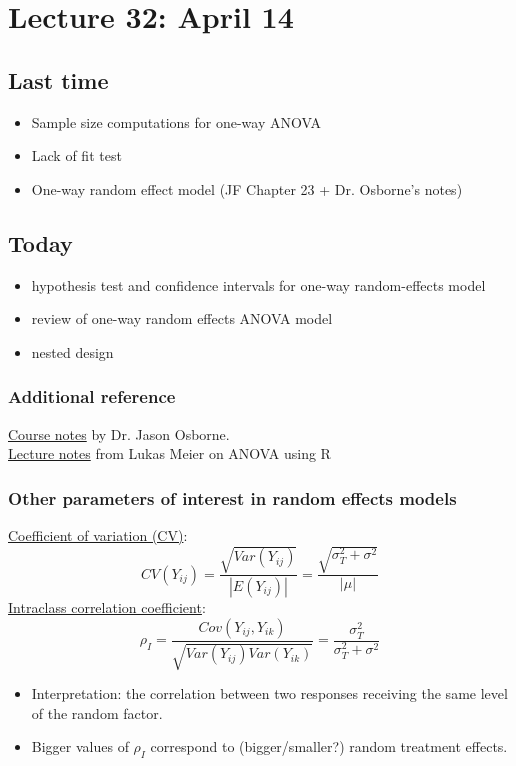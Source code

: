 \setcounter{section}{31}

\section{Lecture 32: April 14}


\subsection*{Last time}
\begin{itemize}
	\item Sample size computations for one-way ANOVA	
\item Lack of fit test	
\item One-way random effect model (JF Chapter 23 + Dr. Osborne's notes)
\end{itemize}


\subsection*{Today}
\begin{itemize}
\item hypothesis test and confidence intervals for one-way random-effects model
\item review of one-way random effects ANOVA model
\item nested design
\end{itemize}

\subsubsection*{Additional reference}
\href{https://www4.stat.ncsu.edu/~osborne/st512r/handouts/allpackets.pdf}{Course notes} by Dr. Jason Osborne.\\
\href{https://stat.ethz.ch/~meier/teaching/anova/random-and-mixed-effects-models.html#random-effects-models}{Lecture notes} from Lukas Meier on ANOVA using R

\subsubsection*{Other parameters of interest in random effects models}
\underline{Coefficient of variation (CV)}:
$$
CV(Y_{ij}) = \frac{\sqrt{\textit{Var}(Y_{ij})}}{|\textit{E}(Y_{ij})|} = \frac{\sqrt{\sigma_T^2 + \sigma^2}}{|\mu|}
$$
\underline{Intraclass correlation coefficient}:
$$
\rho_I = \frac{\textit{Cov}(Y_{ij}, Y_{ik})}{\sqrt{\textit{Var}(Y_{ij}) \textit{Var}(Y_{ik})}}=\frac{\sigma_T^2}{\sigma_T^2 + \sigma^2}
$$
\begin{itemize}
	\item Interpretation: the correlation between two responses receiving the same level of the random factor.
	\item Bigger values of $\rho_I$ correspond to (bigger/smaller?) random treatment effects.
\end{itemize}

